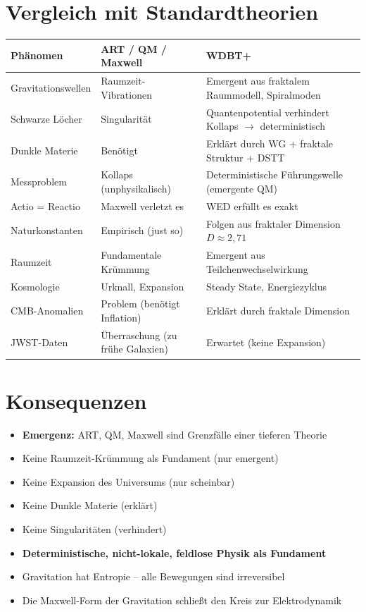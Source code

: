 \documentclass[12pt,a4paper]{article}
\begin{document}
\section*{Vergleich mit Standardtheorien}
\begin{center}
\begin{tabular}{|p{3.0cm}|p{4.2cm}|p{4.5cm}|}
    \hline
    \textbf{Phänomen} & \textbf{ART / QM / Maxwell} & \textbf{WDBT+} \\
    \hline
    Gravitationswellen & Raumzeit-Vibrationen & Emergent aus fraktalem Raummodell, Spiralmoden \\
    \hline
    Schwarze Löcher & Singularität & Quantenpotential verhindert Kollaps $\rightarrow$ deterministisch \\
    \hline
    Dunkle Materie & Benötigt & Erklärt durch WG + fraktale Struktur + DSTT \\
    \hline
    Messproblem & Kollaps (unphysikalisch) & Deterministische Führungswelle (emergente QM) \\
    \hline
    Actio = Reactio & Maxwell verletzt es & WED erfüllt es exakt \\
    \hline
    Naturkonstanten & Empirisch (just so) & Folgen aus fraktaler Dimension $D \approx 2{,}71$ \\
    \hline
    Raumzeit & Fundamentale Krümmung & Emergent aus Teilchenwechselwirkung \\
    \hline
    Kosmologie & Urknall, Expansion & Steady State, Energiezyklus \\
    \hline
    CMB-Anomalien & Problem (benötigt Inflation) & Erklärt durch fraktale Dimension \\
    \hline
    JWST-Daten & Überraschung (zu frühe Galaxien) & Erwartet (keine Expansion) \\
    \hline
\end{tabular}
\end{center}

\section*{Konsequenzen}
\begin{itemize}
    \item \textbf{Emergenz:} ART, QM, Maxwell sind Grenzfälle einer tieferen Theorie
    \item Keine Raumzeit-Krümmung als Fundament (nur emergent)
    \item Keine Expansion des Universums (nur scheinbar)
    \item Keine Dunkle Materie (erklärt)
    \item Keine Singularitäten (verhindert)
    \item \textbf{Deterministische, nicht-lokale, feldlose Physik als Fundament}
    \item Gravitation hat Entropie – alle Bewegungen sind irreversibel
    \item Die Maxwell-Form der Gravitation schließt den Kreis zur Elektrodynamik
\end{itemize}
\end{document}
